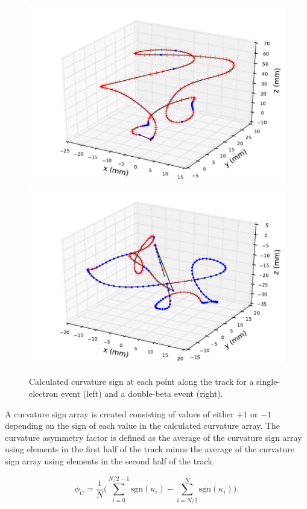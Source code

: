 \documentclass{JINST}
\begin{document}
\begin{figure}[!htb]
	\includegraphics[scale=0.48]{fig/plt_trkcurv_nmagse2_6.pdf}
	\includegraphics[scale=0.48]{fig/plt_trkcurv_nmagbb2_2.pdf}
	\caption{\label{fig_trkcurv}Calculated curvature sign at each point along the track for a single-electron event (left) and a double-beta event (right).}
\end{figure}

A curvature sign array is created consisting of values of either $+1$ or $-1$ depending on the sign of each value in the calculated curvature array.  The curvature asymmetry factor is defined as the average of the curvature sign array using elements in the first half of the track minus the average of the curvature sign array using elements in the second half of the track.

\begin{equation}\label{eqn_assym}
\phi_{C} = \frac{1}{N}\Biggl(\sum_{i=0}^{N/2-1}\mathrm{sgn}(\kappa_{i}) - \sum_{i=N/2}^{N}\mathrm{sgn}(\kappa_{i})\Biggr).
\end{equation}
\end{document}
